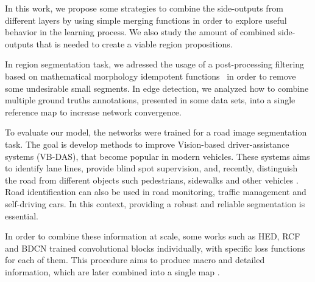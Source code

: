 In this work, we propose some strategies to combine the side-outputs from different layers by using simple merging functions in order to explore useful behavior in the learning process.
We also study the amount of combined side-outputs that is needed to create a viable region propositions.

{\color{red}
In region segmentation task, we adressed the usage of a post-processing filtering based on mathematical morphology idempotent functions~\cite{Najman:2013} in order to remove some undesirable small segments.
In edge detection, we analyzed how to combine multiple ground truths annotations, presented in some data sets, into a single reference map to increase network convergence.

To evaluate our model, the networks were trained for a road image segmentation task. The goal is develop methods to improve Vision-based driver-assistance systems (VB-DAS), that become popular in modern vehicles. These systems aims to identify lane lines, provide blind spot supervision, and, recently, distinguish the road from different objects such pedestrians, sidewalks and other vehicles \cite{Saleem:2018, Yang:2018, Rezaei:2017}. Road identification can also be used in road monitoring, traffic management and self-driving cars. In this context, providing a robust and reliable segmentation is essential.

{
\color{red}

}

In order to combine these information at scale, some works such as HED, RCF and BDCN trained convolutional blocks individually, with specific loss functions for each of them.
This procedure aims to produce macro and detailed information, which are later combined into a single map \cite{Xie:2017:HED:3158436.3158453, RCF:2019, He:2019}.

}
